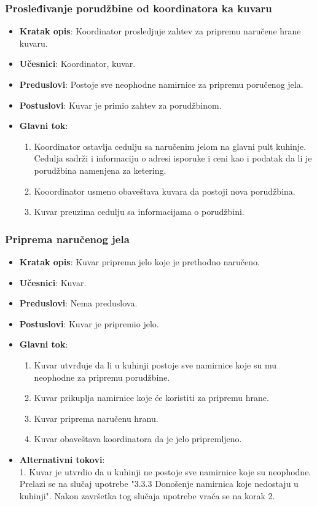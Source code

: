 \subsubsection{Prosleđivanje porudžbine od koordinatora ka kuvaru}
\begin{itemize}
    \item \textbf{Kratak opis}:
    Koordinator prosledjuje zahtev za pripremu naručene hrane kuvaru.
    \item \textbf{Učesnici}:
    Koordinator, kuvar.
    \item \textbf{Preduslovi}:
    Postoje sve neophodne namirnice za pripremu poručenog jela.
    \item \textbf{Postuslovi}:
    Kuvar je primio zahtev za porudžbinom.
    \item \textbf{Glavni tok}:
   \begin{enumerate}
        \item Koordinator ostavlja cedulju sa naručenim jelom na glavni pult kuhinje. Cedulja sadrži i informaciju o adresi isporuke i ceni kao i podatak da li je porudžbina namenjena za ketering.
        \item Kooordinator usmeno obaveštava kuvara da postoji nova porudžbina.
        \item Kuvar preuzima cedulju sa informacijama o porudžbini.
\end{enumerate}
\end{itemize}

\subsubsection{Priprema naručenog jela}
\begin{itemize}
    \item \textbf{Kratak opis}:
    Kuvar priprema jelo koje je prethodno naručeno.
    \item \textbf{Učesnici}:
    Kuvar.
    \item \textbf{Preduslovi}:
    Nema preduslova.
    \item \textbf{Postuslovi}:
    Kuvar je pripremio jelo.
    \item \textbf{Glavni tok}:
   \begin{enumerate}
        \item Kuvar utvrđuje da li u kuhinji postoje sve namirnice koje
        su mu neophodne za pripremu porudžbine.
        \item Kuvar prikuplja namirnice koje će koristiti za pripremu hrane.
        \item Kuvar priprema naručenu hranu.
        \item Kuvar obaveštava koordinatora da je
        jelo pripremljeno.
\end{enumerate}
 \item \textbf{Alternativni tokovi}:\\
     1. Kuvar je utvrdio da u kuhinji ne postoje
     sve namirnice koje su neophodne.
     \\ Prelazi se na slučaj
    upotrebe "3.3.3 Donošenje namirnica koje nedostaju u kuhinji". Nakon završetka tog slučaja upotrebe
    vraća se na korak 2. 
\end{itemize}

